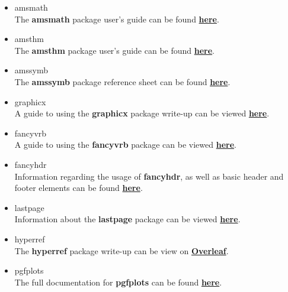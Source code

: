 \documentclass[]{article}
\begin{document}
    \begin{itemize}
        \item amsmath \\
        The \textbf{amsmath} package user's guide can be found \href{http://www.ams.org/arc/tex/amsmath/amsldoc.pdf}{\textbf{here}}.

        \item amsthm \\
        The \textbf{amsthm} package user's guide can be found \href{http://www.ams.org/arc/tex/amscls/amsthdoc.pdf}{\textbf{here}}.

        \item amssymb \\
        The \textbf{amssymb} package reference sheet can be found \href{https://milde.users.sourceforge.net/LUCR/Math/mathpackages/amssymb-symbols.pdf}{\textbf{here}}.

        \item graphicx \\
        A guide to using the \textbf{graphicx} package write-up  can be viewed \href{https://www.kwasan.kyoto-u.ac.jp/solarb6/usinggraphicx.pdf}{\textbf{here}}.

        \item fancyvrb \\
        A guide to using the \textbf{fancyvrb} package can be viewed \href{https://texdoc.org/serve/fancyvrb/0}{\textbf{here}}.

        \item fancyhdr \\
        Information regarding the usage of \textbf{fancyhdr}, as well as basic header and footer elements can be found \href{https://www.overleaf.com/learn/latex/Headers_and_footers}{\textbf{here}}.

        \item lastpage \\
        Information about the \textbf{lastpage} package can be viewed \href{https://ctan.mirror.garr.it/mirrors/ctan/macros/latex/contrib/lastpage/lastpage.pdf}{\textbf{here}}.

        \item hyperref \\
        The \textbf{hyperref} package write-up can be view on \href{https://www.overleaf.com/learn/latex/Hyperlinks}{\textbf{Overleaf}}.

        \item pgfplots \\
        The full documentation for \textbf{pgfplots} can be found \href{https://www.iro.umontreal.ca/~simardr/pgfplots.pdf}{\textbf{here}}.
        
    \end{itemize}
\end{document}
